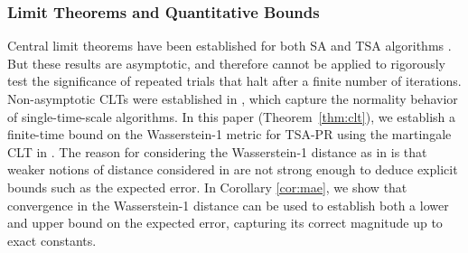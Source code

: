 \subsubsection{Limit Theorems and Quantitative Bounds}
Central limit theorems have been established for both SA and TSA algorithms \citep{polyakJuditsky,mokkadem2006convergence,hu2024central}.
But these results are asymptotic, and therefore cannot be applied to rigorously test the significance of repeated trials that halt after a finite number of iterations. 
Non-asymptotic CLTs were established in \citep{anastasiou2019normal,samsonov2024gaussian,srikant2024CLT}, which capture the normality behavior of single-time-scale algorithms.
In this paper (Theorem~\ref{thm:clt}), we establish a finite-time bound on the Wasserstein-1 metric for TSA-PR using the martingale CLT in \citep{srikant2024CLT}. 
The reason for considering the Wasserstein-1 distance as in \citep{srikant2024CLT} is that weaker notions of distance considered in \citep{anastasiou2019normal,samsonov2024gaussian} are not strong enough to deduce explicit bounds such as the expected error.   
In Corollary \ref{cor:mae}, we show that convergence in the Wasserstein-1 distance can be used to establish both a lower and upper bound on the expected error, capturing its correct magnitude up to exact constants.


